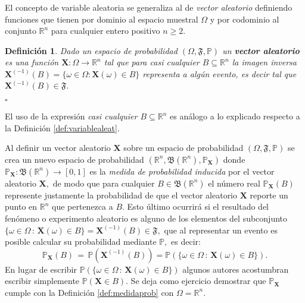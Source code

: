\documentclass[spanish,10pt,letterpaper]{article}
\newtheorem{defi}{Definición}
\newcommand{\prob}{\mathbb{P}}
\newcommand{\Runo}{\mathbb{R}}
\newcommand{\qed}{\begin{flushright}$\square$\end{flushright}}
\begin{document}
El concepto de variable aleatoria se generaliza al de \textit{vector aleatorio} definiendo funciones que tienen por dominio al espacio muestral $\Omega$ y por codominio al conjunto $\Runo^n$ para cualquier entero positivo $n\geq 2.$ 
    
\bigskip

\begin{defi}\label{def:vectoraleat}
Dado un espacio de probabilidad $(\Omega,\mathfrak{F},\prob)$ un \textbf{vector aleatorio} es una función $\mathbf{X}:\Omega\rightarrow\Runo^n$ tal que para casi cualquier  $B\subseteq\Runo^n$ la imagen inversa $\mathbf{X}^{(-1)}(B)=\{\omega\in\Omega:\mathbf{X}(\omega)\in B\}$ representa a algún evento, es decir tal que $\mathbf{X}^{(-1)}(B)\in\mathfrak{F}.$ \qed
\end{defi}

El uso de la expresión \textit{casi cualquier $B\subseteq\Runo^n$} es análogo a lo explicado respecto a la Definición \ref{def:variablealeat}.
	
\medskip 
	
Al definir un vector aleatorio $\mathbf{X}$ sobre un espacio de probabilidad $(\Omega,\mathfrak{F},\prob)$ se crea un nuevo espacio de probabilidad $(\Runo^n,\mathfrak{B}(\Runo^n),\prob_{\mathbf{X}})$ donde $\prob_{\mathbf{X}}:\mathfrak{B}(\Runo^n)\rightarrow[0,1]$ es la \textit{medida de probabilidad inducida} por el vector aleatorio $\mathbf{X},$ de modo que para cualquier $B\in\mathfrak{B}(\Runo^n)$ el número real $\prob_{\mathbf{X}}(B)$ represente justamente la probabilidad de que el vector aleatorio $\mathbf{X}$ reporte un punto en $\Runo^n$ que pertenezca a $B.$ Esto último ocurrirá si el resultado del fenómeno o experimento aleatorio es alguno de los elementos del subconjunto $\{\omega\in\Omega\,:\,\mathbf{X}(\omega)\in B\}=\mathbf{X}^{(-1)}(B)\in\mathfrak{F},$ que al representar un evento es posible calcular su probabilidad mediante $\prob,$ es decir:
	\begin{equation}\label{eq:medidainducida2}
		\prob_{\mathbf{X}}(B) \,=\, \prob(\mathbf{X}^{(-1)}(B)) = \prob\left(\{\omega\in\Omega\,:\,\mathbf{X}(\omega)\in B\}\right).
	\end{equation}
En lugar de escribir $\prob\left(\{\omega\in\Omega\,:\,\mathbf{X}(\omega)\in B\}\right)$ algunos autores acostumbran escribir simplemente $\prob(\mathbf{X}\in B).$ Se deja como ejercicio demostrar que $\prob_{\mathbf{X}}$ cumple con la Definición \ref{def:medidaprob} con $\Omega=\Runo^n.$

\bigskip 
\end{document}
